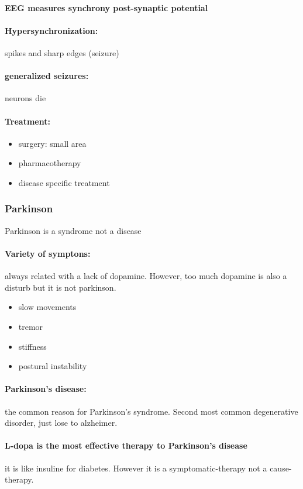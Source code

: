\documentclass[12pt,article,oneside,a4paper]{memoir}
\begin{document}
\paragraph{EEG measures synchrony post-synaptic potential}

\paragraph{Hypersynchronization:} spikes and sharp edges (seizure)
\paragraph{generalized seizures:} neurons die

\paragraph{Treatment:}
\begin{itemize}
\item surgery: small area
\item pharmacotherapy
\item disease specific treatment
\end{itemize}

\subsubsection{Parkinson}
Parkinson is a syndrome not a disease
\paragraph{Variety of symptons:} always related with a lack of dopamine. However, too much dopamine is also a disturb but it is not parkinson.
\begin{itemize}
\item slow movements
\item tremor
\item stiffness
\item postural instability
\end{itemize}

\paragraph{Parkinson's disease:} the common reason for Parkinson's syndrome. Second most common degenerative disorder, just lose to alzheimer.

\paragraph{L-dopa is the most effective therapy to Parkinson's disease} it is like insuline for diabetes. However it is a symptomatic-therapy not a cause-therapy.
\end{document}
